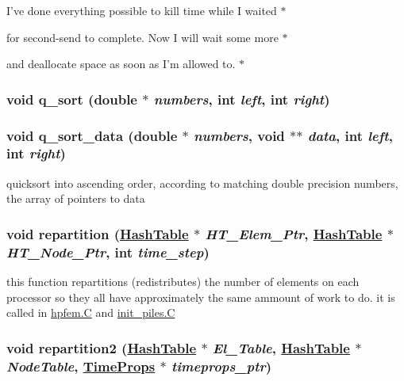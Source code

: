 I've done everything possible to kill time while I waited $\ast$

for second-send to complete. Now I will wait some more $\ast$

and deallocate space as soon as I'm allowed to. $\ast$ \hypertarget{repartition__BSFC_8C_a20}{
\subsubsection[q\_\-sort]{\setlength{\rightskip}{0pt plus 5cm}void q\_\-sort (double $\ast$ {\em numbers}, int {\em left}, int {\em right})}}
\label{repartition__BSFC_8C_a20}


\hypertarget{repartition__BSFC_8C_a19}{
\subsubsection[q\_\-sort\_\-data]{\setlength{\rightskip}{0pt plus 5cm}void q\_\-sort\_\-data (double $\ast$ {\em numbers}, void $\ast$$\ast$ {\em data}, int {\em left}, int {\em right})}}
\label{repartition__BSFC_8C_a19}


quicksort into ascending order, according to matching double precision numbers, the array of pointers to data 

\hypertarget{repartition__BSFC_8C_a15}{
\subsubsection[repartition]{\setlength{\rightskip}{0pt plus 5cm}void repartition (\hyperlink{classHashTable}{Hash\-Table} $\ast$ {\em HT\_\-Elem\_\-Ptr}, \hyperlink{classHashTable}{Hash\-Table} $\ast$ {\em HT\_\-Node\_\-Ptr}, int {\em time\_\-step})}}
\label{repartition__BSFC_8C_a15}


this function repartitions (redistributes) the number of elements on each processor so they all have approximately the same ammount of work to do. it is called in \hyperlink{constant_8h_a21}{hpfem.C} and \hyperlink{constant_8h_a21}{init\_\-piles.C} 

\hypertarget{repartition__BSFC_8C_a16}{
\subsubsection[repartition2]{\setlength{\rightskip}{0pt plus 5cm}void repartition2 (\hyperlink{classHashTable}{Hash\-Table} $\ast$ {\em El\_\-Table}, \hyperlink{classHashTable}{Hash\-Table} $\ast$ {\em Node\-Table}, \hyperlink{structTimeProps}{Time\-Props} $\ast$ {\em timeprops\_\-ptr})}}
\label{repartition__BSFC_8C_a16}


